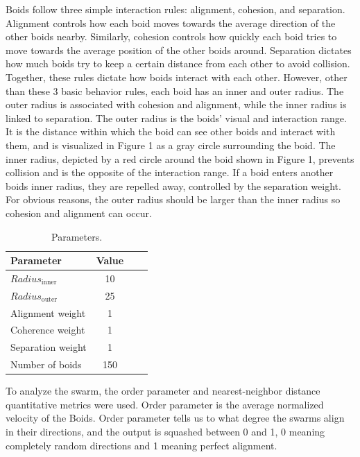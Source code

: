 \documentclass{article}
\begin{document}
Boids follow three simple interaction rules: alignment, cohesion, and separation. Alignment controls how each boid moves towards the average direction of the other boids nearby. Similarly, cohesion controls how quickly each boid tries to move towards the average position of the other boids around. Separation dictates how much boids try to keep a certain distance from each other to avoid collision. Together, these rules dictate how boids interact with each other. However, other than these 3 basic behavior rules, each boid has an inner and outer radius. The outer radius is associated with cohesion and alignment, while the inner radius is linked to separation. The outer radius is the boids' visual and interaction range. It is the distance within which the boid can see other boids and interact with them, and is visualized in Figure 1 as a gray circle surrounding the boid. The inner radius, depicted by a red circle around the boid shown in Figure 1, prevents collision and is the opposite of the interaction range. If a boid enters another boids inner radius, they are repelled away, controlled by the separation weight. For obvious reasons, the outer radius should be larger than the inner radius so cohesion and alignment can occur.



\begin{table}[H]
    \centering
    \begin{tabular}{lccc}
        \hline
        \textbf{Parameter} & \textbf{Value}\\
        \hline
        $Radius_{\text{inner}}$ & 10 \\
        $Radius_{\text{outer}}$ & 25 \\
        Alignment weight & 1 \\
        Coherence weight & 1 \\
        Separation weight & 1 \\
        Number of boids & 150 \\
        \hline
    \end{tabular}
    \caption{Parameters.}
    \label{table:parameters}
\end{table}


To analyze the swarm, the order parameter and nearest-neighbor distance quantitative metrics were used. Order parameter is the average normalized velocity of the Boids. Order parameter tells us to what degree the swarms align in their directions, and the output is squashed between 0 and 1, 0 meaning completely random directions and 1 meaning perfect alignment. 
\end{document}
